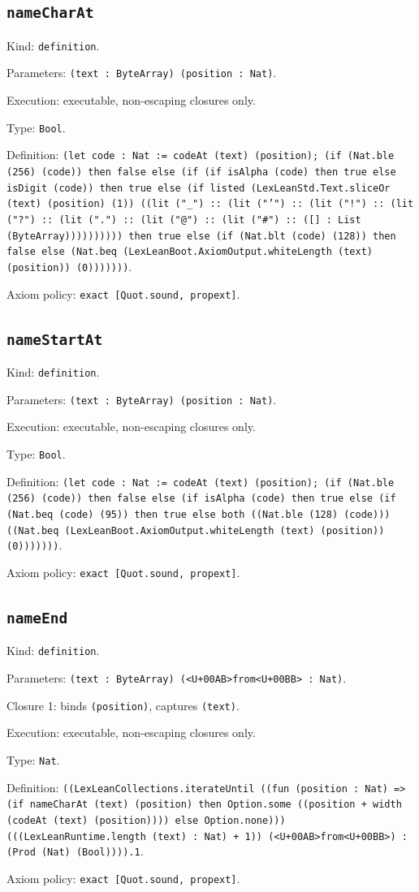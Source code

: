 \documentclass[11pt]{article}
\begin{document}
\subsection*{\texttt{nameCharAt}}
\noindent Kind: \texttt{definition}.\par
\noindent Parameters: \texttt{(text : ByteArray) (position : Nat)}.\par
\noindent Execution: executable, non-escaping closures only.\par
\noindent Type: \texttt{Bool}.\par
\noindent Definition: \texttt{(let code : Nat := codeAt (text) (position); (if (Nat.ble (256) (code)) then false else (if (if isAlpha (code) then true else isDigit (code)) then true else (if listed (LexLeanStd.Text.sliceOr (text) (position) (1)) ((lit ("\_") :: (lit ("'") :: (lit ("!") :: (lit ("?") :: (lit (".") :: (lit ("@") :: (lit ("\#") :: ([] : List (ByteArray)))))))))) then true else (if (Nat.blt (code) (128)) then false else (Nat.beq (LexLeanBoot.AxiomOutput.whiteLength (text) (position)) (0)))))))}.\par
\noindent Axiom policy: \texttt{exact [Quot.sound, propext]}.\par
\subsection*{\texttt{nameStartAt}}
\noindent Kind: \texttt{definition}.\par
\noindent Parameters: \texttt{(text : ByteArray) (position : Nat)}.\par
\noindent Execution: executable, non-escaping closures only.\par
\noindent Type: \texttt{Bool}.\par
\noindent Definition: \texttt{(let code : Nat := codeAt (text) (position); (if (Nat.ble (256) (code)) then false else (if isAlpha (code) then true else (if (Nat.beq (code) (95)) then true else both ((Nat.ble (128) (code))) ((Nat.beq (LexLeanBoot.AxiomOutput.whiteLength (text) (position)) (0)))))))}.\par
\noindent Axiom policy: \texttt{exact [Quot.sound, propext]}.\par
\subsection*{\texttt{nameEnd}}
\noindent Kind: \texttt{definition}.\par
\noindent Parameters: \texttt{(text : ByteArray) (<U+00AB>from<U+00BB> : Nat)}.\par
\noindent Closure 1: binds \texttt{(position)}, captures \texttt{(text)}.\par
\noindent Execution: executable, non-escaping closures only.\par
\noindent Type: \texttt{Nat}.\par
\noindent Definition: \texttt{((LexLeanCollections.iterateUntil ((fun (position : Nat) => (if nameCharAt (text) (position) then Option.some ((position + width (codeAt (text) (position)))) else Option.none))) (((LexLeanRuntime.length (text) : Nat) + 1)) (<U+00AB>from<U+00BB>) : (Prod (Nat) (Bool)))).1}.\par
\noindent Axiom policy: \texttt{exact [Quot.sound, propext]}.\par
\end{document}
